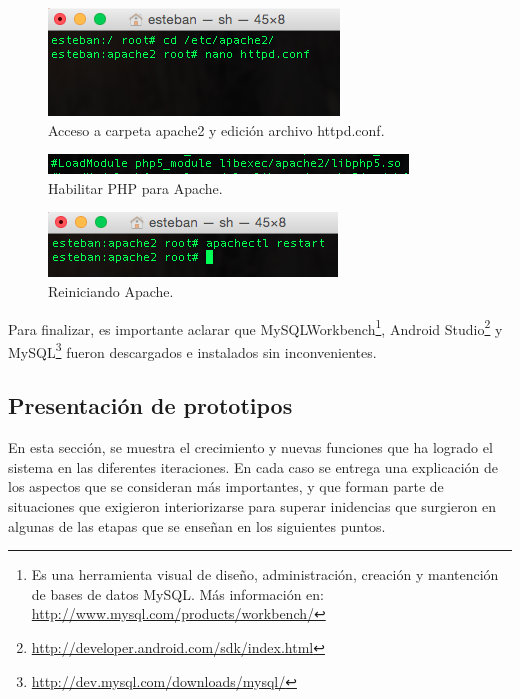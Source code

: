 \begin{figure}[H]
\centering
\includegraphics[scale=0.80]{images/capitulo5/httpd.png}
\caption{Acceso a carpeta apache2 y edición archivo httpd.conf.}
\label{activacionPHP}
\end{figure}

\begin{figure}[H]
\centering
\includegraphics[scale=0.80]{images/capitulo5/libphp.png}
\caption{Habilitar PHP para Apache.}
\label{libphp}
\end{figure}

\begin{figure}[H]
\centering
\includegraphics[scale=0.80]{images/capitulo5/apacheRestart.png}
\caption{Reiniciando Apache.}
\label{apacheRestart}
\end{figure}

Para finalizar, es importante aclarar que MySQLWorkbench\footnote{Es una herramienta visual de diseño, administración, creación y mantención de bases de datos MySQL. Más información en: \url{http://www.mysql.com/products/workbench/}}, Android Studio\footnote{\url{http://developer.android.com/sdk/index.html}} y MySQL\footnote{\url{http://dev.mysql.com/downloads/mysql/}} fueron descargados e instalados sin inconvenientes.\\

\subsection{Presentación de prototipos}

En esta sección, se muestra el crecimiento y nuevas funciones que ha logrado el sistema en las diferentes iteraciones. En cada caso se entrega una explicación de los aspectos que se consideran más importantes, y que forman parte de situaciones que exigieron interiorizarse para superar inidencias que surgieron en algunas de las etapas que se enseñan en los siguientes puntos.\\

